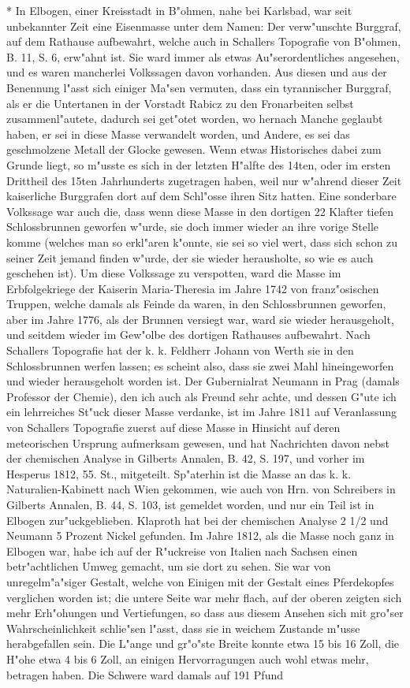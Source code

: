 \documentclass[a4paper, 11pt, oneside, polutonikogreek, german]{article}
\begin{document}
* In Elbogen, einer Kreisstadt in B"ohmen, nahe bei Karlsbad, war seit unbekannter Zeit eine Eisenmasse unter dem Namen: Der verw"unschte Burggraf, auf dem Rathause aufbewahrt, welche auch in Schallers Topografie von B"ohmen, B. 11, S. 6, erw"ahnt ist. Sie ward immer als etwas Au"serordentliches angesehen, und es waren mancherlei Volkssagen davon vorhanden. Aus diesen und aus der Benennung l"asst sich einiger Ma"sen vermuten, dass ein tyrannischer Burggraf, als er die Untertanen in der Vorstadt Rabicz zu den Fronarbeiten selbst zusammenl"autete, dadurch sei get"otet worden, wo hernach Manche geglaubt haben, er sei in diese Masse verwandelt worden, und Andere, es sei das geschmolzene Metall der Glocke gewesen. Wenn etwas Historisches dabei zum Grunde liegt, so m"usste es sich in der letzten H"alfte des 14ten, oder im ersten Drittheil des 15ten Jahrhunderts zugetragen haben, weil nur w"ahrend dieser Zeit kaiserliche Burggrafen dort auf dem Schl"osse ihren Sitz hatten. Eine sonderbare Volkssage war auch die, dass wenn diese Masse in den dortigen 22 Klafter tiefen Schlossbrunnen geworfen w"urde, sie doch immer wieder an ihre vorige Stelle komme (welches man so erkl"aren k"onnte, sie sei so viel wert, dass sich schon zu seiner Zeit jemand finden w"urde, der sie wieder herausholte, so wie es auch geschehen ist). Um diese Volkssage zu verspotten, ward die Masse im Erbfolgekriege der Kaiserin Maria-Theresia im Jahre 1742 von franz"osischen Truppen, welche damals als Feinde da waren, in den Schlossbrunnen geworfen, aber im Jahre 1776, als der Brunnen versiegt war, ward sie wieder herausgeholt, und seitdem wieder im Gew"olbe des dortigen Rathauses aufbewahrt. Nach Schallers Topografie hat der k. k. Feldherr Johann von Werth sie in den Schlossbrunnen werfen lassen; es scheint also, dass sie zwei Mahl hineingeworfen und wieder herausgeholt worden ist. Der Gubernialrat Neumann in Prag (damals Professor der Chemie), den ich auch als Freund sehr achte, und dessen G"ute ich ein lehrreiches St"uck dieser Masse verdanke, ist im Jahre 1811 auf Veranlassung von Schallers Topografie zuerst auf diese Masse in Hinsicht auf deren meteorischen Ursprung aufmerksam gewesen, und hat Nachrichten davon nebst der chemischen Analyse in Gilberts Annalen, B. 42, S. 197, und vorher im Hesperus 1812, 55. St., mitgeteilt. Sp"aterhin ist die Masse an das k. k. Naturalien-Kabinett nach Wien gekommen, wie auch von Hrn. von Schreibers in Gilberts Annalen, B. 44, S. 103, ist gemeldet worden, und nur ein Teil ist in Elbogen zur"uckgeblieben. Klaproth hat bei der chemischen Analyse 2 1/2 und Neumann 5 Prozent Nickel gefunden. Im Jahre 1812, als die Masse noch ganz in Elbogen war, habe ich auf der R"uckreise von Italien nach Sachsen einen betr"achtlichen Umweg gemacht, um sie dort zu sehen. Sie war von unregelm"a"siger Gestalt, welche von Einigen mit der Gestalt eines Pferdekopfes verglichen worden ist; die untere Seite war mehr flach, auf der oberen zeigten sich mehr Erh"ohungen und Vertiefungen, so dass aus diesem Ansehen sich mit gro"ser Wahrscheinlichkeit schlie"sen l"asst, dass sie in weichem Zustande m"usse herabgefallen sein. Die L"ange und gr"o"ste Breite konnte etwa 15 bis 16 Zoll, die H"ohe etwa 4 bis 6 Zoll, an einigen Hervorragungen auch wohl etwas mehr, betragen haben. Die Schwere ward damals auf 191 Pfund 
\end{document}
